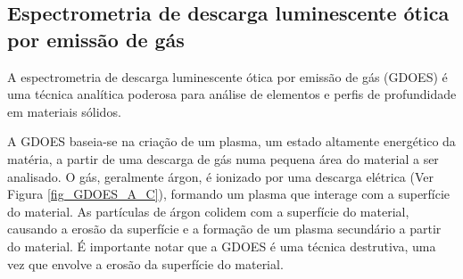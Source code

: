 \newpage
\subsection{Espectrometria de descarga luminescente ótica por emissão de gás}\label{ssec:soa_espectrometria}
A espectrometria de descarga luminescente ótica por emissão de gás (GDOES) é uma técnica analítica poderosa para análise de elementos e perfis de profundidade em materiais sólidos.
\par
A GDOES baseia-se na criação de um plasma, um estado altamente energético da matéria, a partir de uma descarga de gás numa pequena área do material a ser analisado. O gás, geralmente árgon, é ionizado por uma descarga elétrica (Ver Figura \ref{fig_GDOES_A_C}), formando um plasma que interage com a superfície do material. As partículas de árgon colidem com a superfície do material, causando a erosão da superfície e a formação de um plasma secundário a partir do material. É importante notar que a GDOES é uma técnica destrutiva, uma vez que envolve a erosão da superfície do material.

